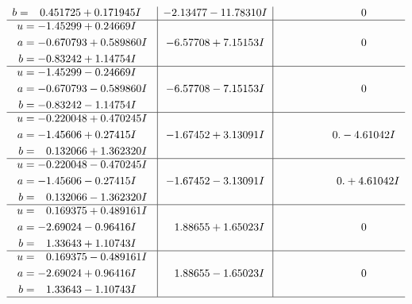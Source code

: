 \documentclass[1p]{elsarticle_modified}
\theoremstyle{definition}
\begin{document}
$$\begin{array}{c|c|c}
\begin{aligned}
b &= \phantom{-}0.451725 + 0.171945 I\end{aligned}
 & -2.13477 - 11.78310 I & \phantom{-0.000000 } 0 \\ \hline\begin{aligned}
u &= -1.45299 + 0.24669 I \\
a &= -0.670793 + 0.589860 I \\
b &= -0.83242 + 1.14754 I\end{aligned}
 & -6.57708 + 7.15153 I & \phantom{-0.000000 } 0 \\ \hline\begin{aligned}
u &= -1.45299 - 0.24669 I \\
a &= -0.670793 - 0.589860 I \\
b &= -0.83242 - 1.14754 I\end{aligned}
 & -6.57708 - 7.15153 I & \phantom{-0.000000 } 0 \\ \hline\begin{aligned}
u &= -0.220048 + 0.470245 I \\
a &= -1.45606 + 0.27415 I \\
b &= \phantom{-}0.132066 + 1.362320 I\end{aligned}
 & -1.67452 + 3.13091 I & \phantom{-0.000000 } 0. - 4.61042 I \\ \hline\begin{aligned}
u &= -0.220048 - 0.470245 I \\
a &= -1.45606 - 0.27415 I \\
b &= \phantom{-}0.132066 - 1.362320 I\end{aligned}
 & -1.67452 - 3.13091 I & \phantom{-0.000000 -}0. + 4.61042 I \\ \hline\begin{aligned}
u &= \phantom{-}0.169375 + 0.489161 I \\
a &= -2.69024 - 0.96416 I \\
b &= \phantom{-}1.33643 + 1.10743 I\end{aligned}
 & \phantom{-}1.88655 + 1.65023 I & \phantom{-0.000000 } 0 \\ \hline\begin{aligned}
u &= \phantom{-}0.169375 - 0.489161 I \\
a &= -2.69024 + 0.96416 I \\
b &= \phantom{-}1.33643 - 1.10743 I\end{aligned}
 & \phantom{-}1.88655 - 1.65023 I & \phantom{-0.000000 } 0\\
 \hline 
 \end{array}$$\newpage$$\begin{array}{c|c|c}  

\end{array}$$
\end{document}
